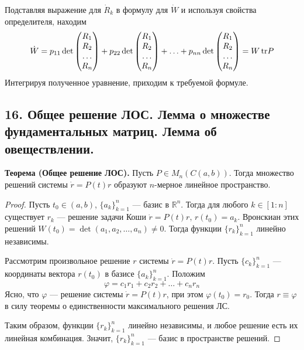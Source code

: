 Подставляя выражение для $\dot{R}_k$ в формулу для $\dot{W}$ и используя свойства определителя, находим
\begin{equation*}
    \dot{W} = p_{11}\det\begin{pmatrix}
        R_1    \\
        R_2    \\
        \ldots \\
        R_n
    \end{pmatrix} + p_{22}\det\begin{pmatrix}
        R_1    \\
        R_2    \\
        \ldots \\
        R_n
    \end{pmatrix} + \ldots + p_{nn}\det\begin{pmatrix}
        R_1    \\
        R_2    \\
        \ldots \\
        R_n
    \end{pmatrix} = W\,\text{tr} P
\end{equation*}
Интегрируя полученное уравнение, приходим к требуемой формуле.

\subsection*{16. Общее решение ЛОС. Лемма о множестве фундаментальных матриц. Лемма об овеществлении.}

\textbf{Теорема (Общее решение ЛОС).} Пусть $P \in M_n(C(a,b))$. Тогда множество решений системы $\dot{r} = P(t)r$ образуют $n$-мерное линейное пространство.

\begin{proof}
    Пусть $t_0 \in (a,b)$, $\{a_k\}_{k=1}^n$ --- базис в $\mathbb{R}^n$. Тогда для любого $k \in [1 : n]$ существует $r_k$ --- решение задачи Коши $\dot{r} = P(t)r,\, r(t_0) = a_k$. Вронскиан этих решений $W(t_0) = \det(a_1, a_2, \ldots, a_n) \neq 0$. Тогда функции $\{r_k\}_{k=1}^n$ линейно независимы.

    Рассмотрим произвольное решение $r$ системы $\dot{r} = P(t)r$. Пусть $\{c_k\}_{k=1}^n$ --- координаты вектора $r(t_0)$ в базисе $\{a_k\}_{k=1}^n$. Положим
    \begin{equation*}
        \varphi = c_1r_1 + c_2r_2 + \ldots + c_nr_n
    \end{equation*}
    Ясно, что $\varphi$ --- решение системы $\dot{r} = P(t)r$, при этом $\varphi(t_0) = r_0$. Тогда $r \equiv \varphi$ в силу теоремы о единственности максимального решения ЛС.

    Таким образом, функции $\{r_k\}_{k=1}^n$ линейно независимы, и любое решение есть их линейная комбинация. Значит, $\{r_k\}_{k=1}^n$ --- базис в пространстве решений.
\end{proof}

